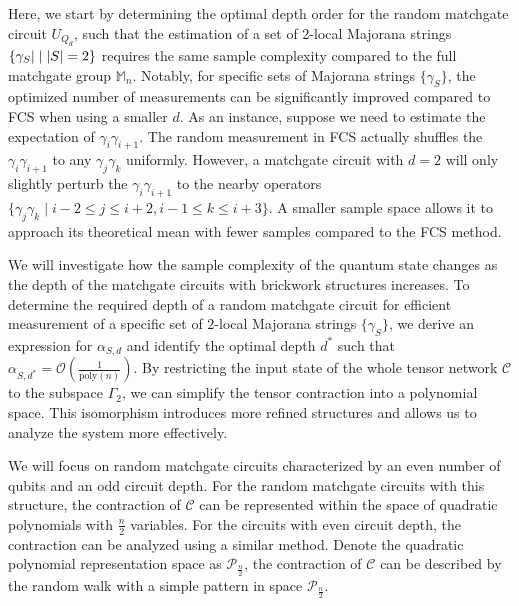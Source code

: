 \documentclass[showpacs,onecolumn,aps,prx,long bibliography,superscriptaddress,notitlepage]{revtex4-1}
\newcommand{\cbra}[1]{\{ #1 \}}
\newcommand{\Mbb}{\mathbb{M}}
\begin{document}
Here, we start by determining the optimal depth order for the random matchgate circuit $U_{Q_d}$, such that the estimation of a set of 2-local Majorana strings $\cbra{\gamma_S|\mid \abs{S}=2}$ requires the same sample complexity compared to the full matchgate group $\Mbb_n$. 
Notably, for specific sets of Majorana strings $\cbra{\gamma_S}$, the optimized number of measurements can be significantly improved compared to FCS when using a smaller $d$. 
As an instance, suppose we need to estimate the expectation of $\gamma_{i}\gamma_{i+1}$. The random measurement in FCS actually shuffles the $\gamma_{i}\gamma_{i+1}$ to any 
$\gamma_{j} \gamma_k$ uniformly. However, a matchgate circuit with $d=2$ will only slightly perturb the   $\gamma_{i}\gamma_{i+1}$ to the nearby operators $\{\gamma_{j}\gamma_{k} \mid i-2\leq j \leq i+2, i-1\leq k \leq i+3\}$. A smaller sample space allows it to approach its theoretical mean with fewer samples compared to the FCS method.

We will investigate how the sample complexity of the quantum state changes as the depth of the matchgate circuits with brickwork structures increases. To determine the required depth of a random matchgate circuit for efficient measurement of a specific set of $2$-local Majorana strings $\cbra{\gamma_S}$, we derive an expression for $\alpha_{S,d}$ and identify the optimal depth $d^\ast$ such that $\alpha_{S,d^\ast} = \mathcal{O}(\frac{1}{\mathrm{poly}(n)})$. 
By restricting the input state of the whole tensor network $\mathcal{C}$ to the subspace $\Gamma_2$, we can simplify the tensor contraction into a polynomial space. This isomorphism introduces more refined structures and allows us to analyze the system more effectively. 




We will focus on random matchgate circuits characterized by an even number of qubits and an odd circuit depth. For the random matchgate circuits with this structure, the contraction of $\mathcal{C}$ can be represented within the space of quadratic polynomials with $ \frac{n}{2} $ variables. For the circuits with even circuit depth, the contraction can be analyzed using a similar method. Denote the quadratic polynomial representation space as $\mathcal{P}_{\frac{n}{2}}$, the contraction of $\mathcal{C}$  can be described by the random walk with a simple pattern in space $\mathcal{P}_{\frac{n}{2}}$.
\end{document}
